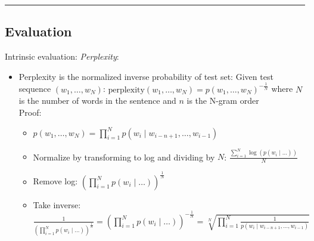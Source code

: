 {\color{black}\hrule height 0.001mm}

\subsection*{Evaluation}
Intrinsic evaluation: \emph{Perplexity}:
\begin{itemize}
    \item Perplexity is the normalized inverse probability of test set: Given test sequence $(w_1, \dots, w_N)$:
    $
    \text{perplexity}(w_1, \dots, w_N) = p(w_1, \dots, w_N)^{-\frac{1}{N}} 
    $
    where $N$ is the number of words in the sentence and $n$ is the N-gram order\\
    Proof:
    \begin{itemize}
        \item $
        p(w_1, \dots, w_N) = \prod_{i=1}^N p(w_i \mid w_{i-n+1}, \dots, w_{i-1})
        $
        \item Normalize by transforming to log and dividing by $N$:
        $
        \frac{\sum_{i=1}^N \log \left( p(w_i \mid \dots) \right)}{N}
        $
        \item Remove log:
        $
        \left( \prod_{i=1}^N p(w_i \mid \dots) \right)^{\frac{1}{N}}
        $
        \item Take inverse:
        $
        \frac{1}{\left( \prod_{i=1}^N p(w_i \mid \dots) \right)^{\frac{1}{N}}} = \left( \prod_{i=1}^N p(w_i \mid \dots) \right)^{-\frac{1}{N}} = \sqrt[N]{ \prod_{i=1}^N \frac{1}{p(w_i \mid w_{i-n+1}, \dots, w_{i-1})}}
        $
    \end{itemize}
\end{itemize}
